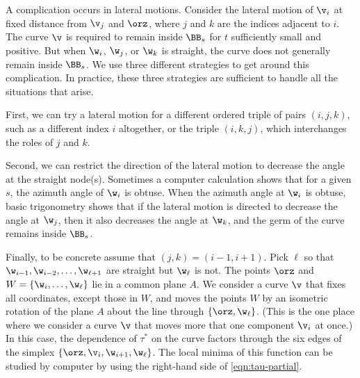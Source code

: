 \begin{remark}
  A complication occurs in lateral motions.  Consider the lateral
  motion of $\v_i$ at fixed distance from $\v_j$ and $\orz$, where $j$
  and $k$ are the indices adjacent to $i$.  The curve $\v$ is
  required to remain inside $\BB_s$ for $t$ sufficiently small and
  positive.  But when $\w_i$, $\w_j$, or $\w_k$ is straight, the curve does
  not generally remain inside $\BB_s$.  We use three different
  strategies to get around this complication.  In practice, these
  three strategies are sufficient to handle all the situations that arise.

First, we can try
  a lateral motion for a different ordered triple of pairs $(i,j,k)$,
  such as  a different index $i$ altogether, or the triple
   $(i,k,j)$, which interchanges the roles of $j$ and $k$.
 


Second, we can restrict the direction of the lateral motion to
decrease the angle at the straight node(s).  Sometimes a
  computer calculation shows that for a given $s$, the azimuth angle
  of $\w_i$ is obtuse.  When the azimuth angle at $\w_i$ is obtuse, 
  basic trigonometry shows that if the lateral motion is directed
 to decrease the angle at $\w_j$, then it also decreases the angle at $\w_k$,
   and the germ of the curve remains inside
  $\BB_s$.

Finally, to be concrete assume that $(j,k)=(i-1,i+1)$.
Pick $\ell$ so that $\w_{i-1},\w_{i-2},\ldots,\w_{\ell+1}$ are straight but
$\w_{\ell}$ is not. The points $\orz$ and
$W=\{\w_{i},\ldots,\w_{\ell}\}$ lie in a common plane $A$.  We
consider a curve $\v$ that fixes all coordinates, except those in $W$,
and moves the points $W$ by an isometric rotation of the plane $A$ about the line
through $\{\orz,\w_{\ell}\}$.  (This is the one place where we
consider a curve $\v$ that moves more that one component $\v_i$ at
once.)  In this case, the dependence of $\tau^*$ on the curve factors
through the six edges of the simplex
$\{\orz,\v_i,\w_{i+1},\w_{\ell}\}$.  The local minima of this function
can be studied by computer by using the right-hand side of \eqref{eqn:tau-partial}.
\end{remark}


